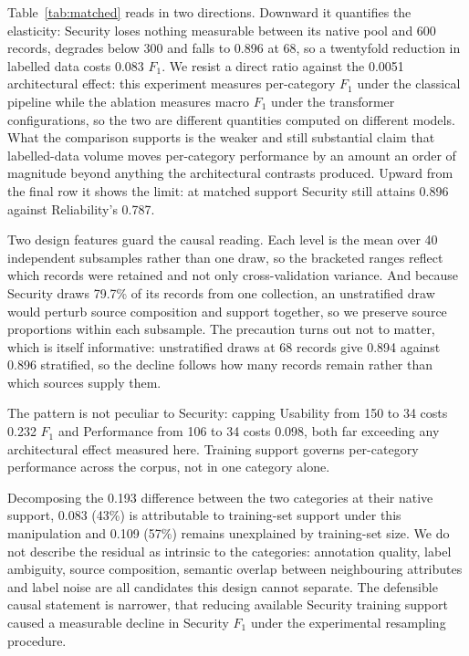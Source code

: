 \documentclass[11pt,a4paper]{article}
\begin{document}
Table~\ref{tab:matched} reads in two directions. Downward it quantifies the elasticity:
Security loses nothing measurable between its native pool and 600 records, degrades below 300
and falls to 0.896 at 68, so a twentyfold reduction in labelled data costs 0.083 $F_1$. We resist a direct ratio against the 0.0051
architectural effect: this experiment measures per-category $F_1$ under the classical pipeline while the
ablation measures macro $F_1$ under the transformer configurations, so the two are different quantities
computed on different models. What the comparison supports is the weaker and still substantial claim that
labelled-data volume moves per-category performance by an amount an order of magnitude beyond anything the
architectural contrasts produced. Upward from the final row it shows the
limit: at matched support Security still attains 0.896 against Reliability's 0.787.

Two design features guard the causal reading. Each level is the mean over 40 independent
subsamples rather than one draw, so the bracketed ranges reflect which records were retained
and not only cross-validation variance. And because Security draws 79.7\% of its records from
one collection, an unstratified draw would perturb source composition and support together, so
we preserve source proportions within each subsample. The precaution turns out not to matter,
which is itself informative: unstratified draws at 68 records give 0.894 against 0.896
stratified, so the decline follows how many records remain rather than which sources supply
them.

The pattern is not peculiar to Security: capping Usability from 150 to 34 costs 0.232 $F_1$ and
Performance from 106 to 34 costs 0.098, both far exceeding any architectural effect measured
here. Training support governs per-category performance across the corpus, not in one category
alone.

Decomposing the 0.193 difference between the two categories at their native support, 0.083
(43\%) is attributable to training-set support under this manipulation and 0.109 (57\%)
remains unexplained by training-set size. We do not describe the residual as intrinsic to the categories: annotation quality, label
ambiguity, source composition, semantic overlap between neighbouring attributes and label noise
are all candidates this design cannot separate. The defensible causal statement is narrower, that
reducing available Security training support caused a measurable decline in Security $F_1$
under the experimental resampling procedure.
\end{document}
